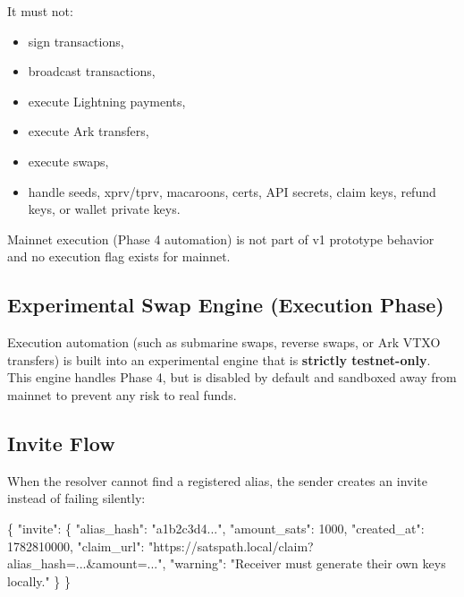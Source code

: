 \documentclass[
]{article}
\newenvironment{Shaded}{}{}
\newcommand{\DataTypeTok}[1]{\textcolor[rgb]{0.56,0.13,0.00}{#1}}
\newcommand{\DecValTok}[1]{\textcolor[rgb]{0.25,0.63,0.44}{#1}}
\newcommand{\FunctionTok}[1]{\textcolor[rgb]{0.02,0.16,0.49}{#1}}
\newcommand{\StringTok}[1]{\textcolor[rgb]{0.25,0.44,0.63}{#1}}
\providecommand{\tightlist}{%
  \setlength{\itemsep}{0pt}\setlength{\parskip}{0pt}}
\begin{document}
It must not:

\begin{itemize}
\tightlist
\item
  sign transactions,
\item
  broadcast transactions,
\item
  execute Lightning payments,
\item
  execute Ark transfers,
\item
  execute swaps,
\item
  handle seeds, xprv/tprv, macaroons, certs, API secrets, claim keys,
  refund keys, or wallet private keys.
\end{itemize}

Mainnet execution (Phase 4 automation) is not part of v1 prototype
behavior and no execution flag exists for mainnet.

\hypertarget{experimental-swap-engine-execution-phase}{%
\subsection{Experimental Swap Engine (Execution
Phase)}\label{experimental-swap-engine-execution-phase}}

Execution automation (such as submarine swaps, reverse swaps, or Ark
VTXO transfers) is built into an experimental engine that is
\textbf{strictly testnet-only}. This engine handles Phase 4, but is
disabled by default and sandboxed away from mainnet to prevent any risk
to real funds.

\hypertarget{invite-flow}{%
\subsection{Invite Flow}\label{invite-flow}}

When the resolver cannot find a registered alias, the sender creates an
invite instead of failing silently:

\begin{Shaded}
\begin{Highlighting}[]
\FunctionTok{\{}
  \DataTypeTok{"invite"}\FunctionTok{:} \FunctionTok{\{}
    \DataTypeTok{"alias\_hash"}\FunctionTok{:} \StringTok{"a1b2c3d4..."}\FunctionTok{,}
    \DataTypeTok{"amount\_sats"}\FunctionTok{:} \DecValTok{1000}\FunctionTok{,}
    \DataTypeTok{"created\_at"}\FunctionTok{:} \DecValTok{1782810000}\FunctionTok{,}
    \DataTypeTok{"claim\_url"}\FunctionTok{:} \StringTok{"https://satspath.local/claim?alias\_hash=...\&amount=..."}\FunctionTok{,}
    \DataTypeTok{"warning"}\FunctionTok{:} \StringTok{"Receiver must generate their own keys locally."}
  \FunctionTok{\}}
\FunctionTok{\}}
\end{Highlighting}
\end{Shaded}
\end{document}
